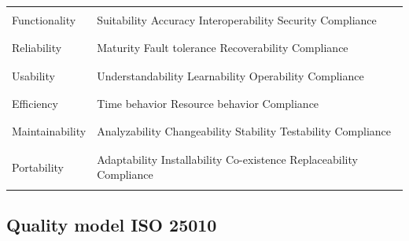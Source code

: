 \begin{longtable}{p{} | p{}}
    \hline
    \endlastfoot
    \\
    Functionality & 
    Suitability \newline
    Accuracy \newline
    Interoperability \newline
    Security \newline
    Compliance \\
    \\
    \hline
    \\
    Reliability & 
    Maturity \newline
    Fault tolerance \newline
    Recoverability \newline
    Compliance \\
    \\
    \hline
    \\
    Usability & 
    Understandability \newline
    Learnability \newline
    Operability \newline
    Compliance \\
    \\
    \hline
    \\
    Efficiency & 
    Time behavior \newline
    Resource behavior \newline
    Compliance \\
    \\
    \hline
    \\
    Maintainability & 
    Analyzability \newline
    Changeability \newline
    Stability \newline
    Testability \newline
    Compliance \\
    \\
    \hline
    \\
    Portability & 
    Adaptability \newline
    Installability \newline
    Co-existence \newline
    Replaceability \newline
    Compliance \\
    \\
    
\end{longtable}


\subsection{Quality model ISO 25010 }


